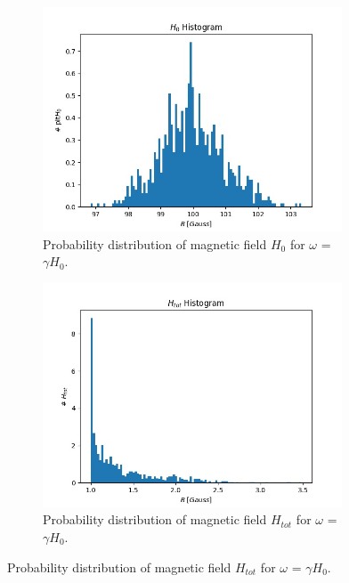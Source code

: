 \documentclass[%
 reprint,
 amsmath,
 amssymb,
 aps,
]{revtex4-1}
\begin{document}
	\begin{figure}

		\centering
		\begin{subfigure}[h]{0.4\textwidth}
			\includegraphics[width=3.5in]{hist_h_0.jpg}
			\caption[Gaussian of $H_0$ on resonance]
			{Probability distribution of magnetic field $H_0$ for $\omega$ = $\gamma H_0$.}
		\end{subfigure}

		\begin{subfigure}[h]{0.4\textwidth}
			\includegraphics[width=3.5in]{hist_h_tot.jpg}
			\caption[Gaussian of $H_0$ on resonance]
			{Probability distribution of magnetic field $H_{tot}$ for $\omega$ = $\gamma H_0$.}
		\end{subfigure}

	\end{figure}
\end{document}
